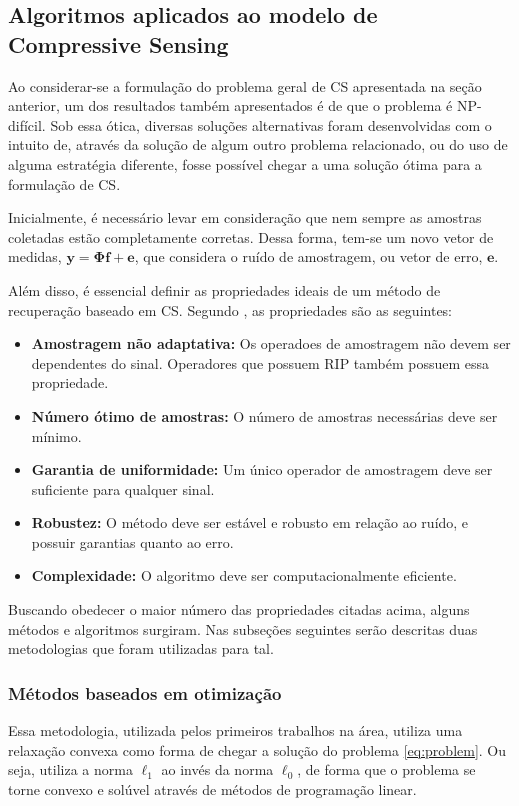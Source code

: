 \documentclass[cic,tc]{iiufrgs}
\renewcommand{\vec}[1]{\bm{#1}}
\begin{document}
\subsection{Algoritmos aplicados ao modelo de Compressive Sensing}
\label{sec:csalgo}
Ao considerar-se a formulação do problema geral de CS apresentada na seção anterior, um dos resultados também apresentados
é de que o problema é NP-difícil. Sob essa ótica, diversas soluções alternativas foram desenvolvidas com 
o intuito de, através da solução de algum outro problema relacionado, ou do uso de alguma estratégia diferente, fosse possível 
chegar a uma solução ótima para a formulação de CS. 

Inicialmente, é necessário levar em consideração que nem sempre as amostras coletadas estão completamente corretas.
Dessa forma, tem-se um novo vetor de medidas, $\vec{y} = \mathbf{\Phi} \vec{f} + \vec{e}$, que considera o ruído de amostragem, 
ou vetor de erro, $\vec{e}$.

Além disso, é essencial definir as propriedades ideais de um método de recuperação
baseado em CS. Segundo \citet{chen2015compressed}, as propriedades são as seguintes:
\begin{itemize}
    \item \textbf{Amostragem não adaptativa:} Os operadoes de amostragem não devem ser dependentes do sinal. 
          Operadores que possuem RIP também possuem essa propriedade.
    \item \textbf{Número ótimo de amostras:} O número de amostras necessárias deve ser mínimo.
    \item \textbf{Garantia de uniformidade:} Um único operador de amostragem deve ser suficiente para qualquer sinal.
    \item \textbf{Robustez:} O método deve ser estável e robusto em relação ao ruído, e possuir garantias 
          quanto ao erro.
    \item \textbf{Complexidade:} O algoritmo deve ser computacionalmente eficiente.
\end{itemize}

Buscando obedecer o maior número das propriedades citadas acima, alguns métodos e algoritmos surgiram. 
Nas subseções seguintes serão descritas duas metodologias que foram utilizadas para tal.

\subsubsection{Métodos baseados em otimização}
Essa metodologia, utilizada pelos primeiros trabalhos na área, utiliza uma relaxação convexa como forma
de chegar a solução do problema \eqref{eq:problem}. 
Ou seja, utiliza a norma $\ell_1$ ao invés da norma $\ell_0$,
de forma que o problema se torne convexo e solúvel através de métodos de programação linear.
\end{document}
